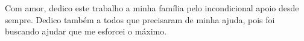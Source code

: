 \begin{dedicatoria}
	\vspace*{\fill}
		Com amor, dedico este trabalho a minha família pelo incondicional apoio desde sempre. Dedico também a todos que precisaram de minha ajuda, pois foi buscando ajudar que me esforcei o máximo.
	\vspace*{\fill}
\end{dedicatoria}